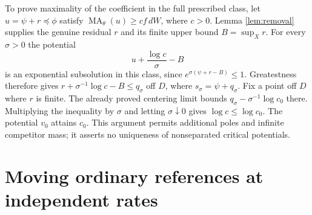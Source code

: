 \documentclass[11pt]{article}
\newcommand{\MA}{\operatorname{MA}}
\theoremstyle{remark}\newtheorem{remark}[theorem]{Remark}
\begin{document}
To prove maximality of the coefficient in the full prescribed class, let
$u=\psi+r\preceq\phi$ satisfy $\MA_\theta(u)\geq c f\,dW$, where $c>0$.
Lemma \ref{lem:removal} supplies the genuine residual $r$ and its finite
upper bound $B=\sup_Xr$. For every $\sigma>0$ the potential
\[
 u+\frac{\log c}{\sigma}-B
\]
is an exponential subsolution in this class, since
$e^{\sigma(\psi+r-B)}\leq1$. Greatestness therefore gives
$r+\sigma^{-1}\log c-B\leq q_\sigma$ off $D$, where
$s_\sigma=\psi+q_\sigma$. Fix a point off $D$ where $r$ is finite.
The already proved centering limit bounds
$q_\sigma-\sigma^{-1}\log c_0$ there. Multiplying the inequality by
$\sigma$ and letting $\sigma\downarrow0$ gives $\log c\leq\log c_0$.
The potential $v_0$ attains $c_0$. This argument permits additional poles
and infinite competitor mass; it asserts no uniqueness of nonseparated
critical potentials.

\section{Moving ordinary references at independent rates}
\end{document}
